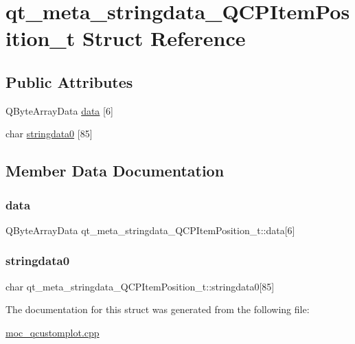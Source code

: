 \hypertarget{structqt__meta__stringdata__QCPItemPosition__t}{}\section{qt\+\_\+meta\+\_\+stringdata\+\_\+\+Q\+C\+P\+Item\+Position\+\_\+t Struct Reference}
\label{structqt__meta__stringdata__QCPItemPosition__t}
\subsection*{Public Attributes}
\begin{DoxyCompactItemize}
\item 
Q\+Byte\+Array\+Data \mbox{\hyperlink{structqt__meta__stringdata__QCPItemPosition__t_a7efdce6b4c431297ac7218626630d15f}{data}} \mbox{[}6\mbox{]}
\item 
char \mbox{\hyperlink{structqt__meta__stringdata__QCPItemPosition__t_a0321410c49080a232c195e07eac0ea1a}{stringdata0}} \mbox{[}85\mbox{]}
\end{DoxyCompactItemize}


\subsection{Member Data Documentation}
\mbox{\label{structqt__meta__stringdata__QCPItemPosition__t_a7efdce6b4c431297ac7218626630d15f}} 
\subsubsection{\texorpdfstring{data}{data}}
{\footnotesize\ttfamily Q\+Byte\+Array\+Data qt\+\_\+meta\+\_\+stringdata\+\_\+\+Q\+C\+P\+Item\+Position\+\_\+t\+::data\mbox{[}6\mbox{]}}

\mbox{\label{structqt__meta__stringdata__QCPItemPosition__t_a0321410c49080a232c195e07eac0ea1a}} 
\subsubsection{\texorpdfstring{stringdata0}{stringdata0}}
{\footnotesize\ttfamily char qt\+\_\+meta\+\_\+stringdata\+\_\+\+Q\+C\+P\+Item\+Position\+\_\+t\+::stringdata0\mbox{[}85\mbox{]}}



The documentation for this struct was generated from the following file\+:\begin{DoxyCompactItemize}
\item 
\mbox{\hyperlink{moc__qcustomplot_8cpp}{moc\+\_\+qcustomplot.\+cpp}}\end{DoxyCompactItemize}
